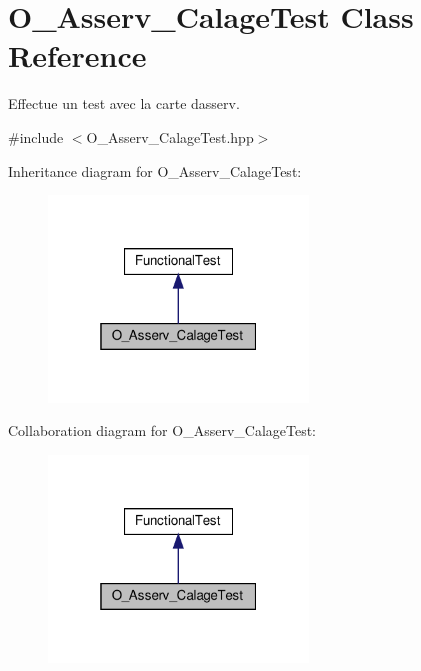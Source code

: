 \hypertarget{classO__Asserv__CalageTest}{}\section{O\+\_\+\+Asserv\+\_\+\+Calage\+Test Class Reference}
\label{classO__Asserv__CalageTest}


Effectue un test avec la carte d\textquotesingle{}asserv.  




{\ttfamily \#include $<$O\+\_\+\+Asserv\+\_\+\+Calage\+Test.\+hpp$>$}



Inheritance diagram for O\+\_\+\+Asserv\+\_\+\+Calage\+Test\+:
\nopagebreak
\begin{figure}[H]
\begin{center}
\leavevmode
\includegraphics[width=196pt]{classO__Asserv__CalageTest__inherit__graph}
\end{center}
\end{figure}


Collaboration diagram for O\+\_\+\+Asserv\+\_\+\+Calage\+Test\+:
\nopagebreak
\begin{figure}[H]
\begin{center}
\leavevmode
\includegraphics[width=196pt]{classO__Asserv__CalageTest__coll__graph}
\end{center}
\end{figure}
